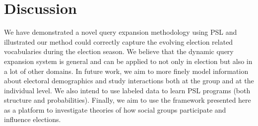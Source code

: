 \section{Discussion}
We have demonstrated a novel query expansion methodology using PSL and illustrated our method could correctly capture the evolving election related vocabularies during the election season.
We believe that the dynamic query expansion system is general and can be applied to not only in election but also in a lot of other domains. In future work, we aim to more finely model information about electoral demographics and study
interactions both at the group and at the individual level. We also intend to use labeled data to learn
PSL programs (both structure and probabilities). Finally, we aim to use the framework presented
here as a platform to investigate theories of how social groups participate and influence elections.

